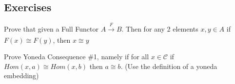 \subsection*{Exercises}

\begin{Exercise}
    Prove that given a Full Functor $A \xrightarrow[]{F} B$. Then for any 2 elements $x,y \in A$ if $F(x) \cong F(y)$, then $x \cong y$
\end{Exercise}



\begin{Exercise}
    Prove Yoneda Consequence \#1, namely if for all $x \in \mathcal{C}$ if $Hom(x,a) \cong Hom(x,b)$ then $a \cong b$. (Use the definition of a yoneda embedding)
\end{Exercise}